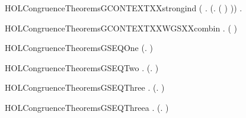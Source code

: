 \begin{SaveVerbatim}{HOLCongruenceTheoremsGCONTEXTXXstrongind}
       (\HOLSymConst{\HOLTokenForall{}} .
              \HOLSymConst{\HOLTokenConj{}}   \HOLSymConst{\HOLTokenImp{}}
             (\HOLTokenLambda{}.  ( ) )) \HOLSymConst{\HOLTokenImp{}}
       \HOLSymConst{\HOLTokenForall{}}.   \HOLSymConst{\HOLTokenImp{}}  
\end{SaveVerbatim}
\newcommand{\HOLCongruenceTheoremsGCONTEXTXXstrongind}{\UseVerbatim{HOLCongruenceTheoremsGCONTEXTXXstrongind}}
\begin{SaveVerbatim}{HOLCongruenceTheoremsGCONTEXTXXWGSXXcombin}
\HOLTokenTurnstile{} \HOLSymConst{\HOLTokenForall{}} .   \HOLSymConst{\HOLTokenConj{}}   \HOLSymConst{\HOLTokenImp{}}  ( \HOLConst{\HOLTokenCompose} )
\end{SaveVerbatim}
\newcommand{\HOLCongruenceTheoremsGCONTEXTXXWGSXXcombin}{\UseVerbatim{HOLCongruenceTheoremsGCONTEXTXXWGSXXcombin}}
\begin{SaveVerbatim}{HOLCongruenceTheoremsGSEQOne}
\HOLTokenTurnstile{}  (\HOLTokenLambda{}. )
\end{SaveVerbatim}
\newcommand{\HOLCongruenceTheoremsGSEQOne}{\UseVerbatim{HOLCongruenceTheoremsGSEQOne}}
\begin{SaveVerbatim}{HOLCongruenceTheoremsGSEQTwo}
\HOLTokenTurnstile{} \HOLSymConst{\HOLTokenForall{}}.  (\HOLTokenLambda{}. )
\end{SaveVerbatim}
\newcommand{\HOLCongruenceTheoremsGSEQTwo}{\UseVerbatim{HOLCongruenceTheoremsGSEQTwo}}
\begin{SaveVerbatim}{HOLCongruenceTheoremsGSEQThree}
\HOLTokenTurnstile{} \HOLSymConst{\HOLTokenForall{}} .   \HOLSymConst{\HOLTokenImp{}}  (\HOLTokenLambda{}.  )
\end{SaveVerbatim}
\newcommand{\HOLCongruenceTheoremsGSEQThree}{\UseVerbatim{HOLCongruenceTheoremsGSEQThree}}
\begin{SaveVerbatim}{HOLCongruenceTheoremsGSEQThreea}
\HOLTokenTurnstile{} \HOLSymConst{\HOLTokenForall{}}.  (\HOLTokenLambda{}. )
\end{SaveVerbatim}
